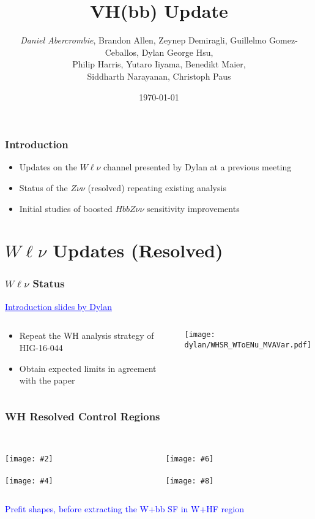 \documentclass{beamer}
\author[D. Abercrombie]{
  \emph{Daniel Abercrombie}, Brandon Allen, Zeynep Demiragli,
  Guillelmo Gomez-Ceballos, Dylan George Hsu, \\
  Philip Harris, Yutaro Iiyama, Benedikt Maier, \\
  Siddharth Narayanan, Christoph Paus
}
\title{\bf \sffamily VH(bb) Update}
\date{\today}
\newcommand{\link}[2]{\href{#2}{\textcolor{blue}{\underline{#1}}}}
\newcommand{\wfourfigs}[8]{
  \begin{columns}
    \begin{column}{0.45\linewidth}
      \centering
      \textcolor{blue}{#1} \\
      \texttt{[image: \#2]} \\
      \textcolor{blue}{#3} \\
      \texttt{[image: \#4]}
    \end{column}
    \begin{column}{0.45\linewidth}
      \centering
      \textcolor{blue}{#5} \\
      \texttt{[image: \#6]} \\
      \textcolor{blue}{#7} \\
      \texttt{[image: \#8]}
    \end{column}
  \end{columns}
}
\begin{document}
\begin{frame}[nonumbering]
  \titlepage

\end{frame}

\begin{frame}
  \frametitle{Introduction}
  \begin{itemize}
  \item Updates on the $W\ell\nu$ channel presented by Dylan at a previous meeting
  \item Status of the $Z\nu\nu$ (resolved) repeating existing analysis
  \item Initial studies of boosted $HbbZ\nu\nu$ sensitivity improvements
  \end{itemize}
\end{frame}

\section{$W\ell\nu$ Updates (Resolved)}

\begin{frame}
  \frametitle{$W\ell\nu$ Status}
  \link{Introduction slides by Dylan}{https://indico.cern.ch/event/690727/contributions/2890780/attachments/1603908/2545128/2018-02-21_statusReportVH.pdf}

  \begin{columns}
    \begin{column}{0.4\linewidth}
      \begin{itemize}
      \item Repeat the WH analysis strategy of HIG-16-044
      \item Obtain expected limits in agreement with the paper
      \end{itemize}
    \end{column}
    \begin{column}{0.6\linewidth}
      \texttt{[image: dylan/WHSR\_WToENu\_MVAVar.pdf]}
    \end{column}
  \end{columns}

\end{frame}

\begin{frame}
  \frametitle{WH Resolved Control Regions}

  \wfourfigs{}{dylan/WH2TopCR_WToENu_MVAVar.pdf}
            {}{dylan/WHHeavyFlavorLowMassCR_WToMuNu_MVAVar.pdf}
            {}{dylan/WHLightFlavorCR_WToMuNu_MVAVar.pdf}
            {}{dylan/WHHeavyFlavorHighMassCR_WToENu_MVAVar.pdf}

  \centering
  \textcolor{blue}{Prefit shapes, before extracting the W+bb SF in W+HF region}
\end{frame}
\end{document}
